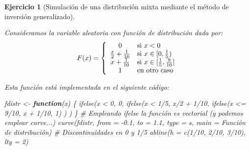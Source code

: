 \documentclass[
]{book}
\newenvironment{Shaded}{\begin{snugshade}}{\end{snugshade}}
\newcommand{\AttributeTok}[1]{\textcolor[rgb]{0.77,0.63,0.00}{#1}}
\newcommand{\CommentTok}[1]{\textcolor[rgb]{0.56,0.35,0.01}{\textit{#1}}}
\newcommand{\ControlFlowTok}[1]{\textcolor[rgb]{0.13,0.29,0.53}{\textbf{#1}}}
\newcommand{\DecValTok}[1]{\textcolor[rgb]{0.00,0.00,0.81}{#1}}
\newcommand{\FloatTok}[1]{\textcolor[rgb]{0.00,0.00,0.81}{#1}}
\newcommand{\FunctionTok}[1]{\textcolor[rgb]{0.00,0.00,0.00}{#1}}
\newcommand{\NormalTok}[1]{#1}
\newcommand{\OtherTok}[1]{\textcolor[rgb]{0.56,0.35,0.01}{#1}}
\newcommand{\SpecialCharTok}[1]{\textcolor[rgb]{0.00,0.00,0.00}{#1}}
\newcommand{\StringTok}[1]{\textcolor[rgb]{0.31,0.60,0.02}{#1}}
\theoremstyle{break}
\newtheorem{exercise}{Ejercicio}[chapter]
\theoremstyle{nonumberplain}
\begin{document}
\begin{exercise}[Simulación de una distribución mixta mediante el método de inversión generalizado]
\protect\hypertarget{exr:mixta-cuantil}{}\label{exr:mixta-cuantil}

Consideramos la variable aleatoria con función de distribución dada por:
\[F(x)=\left\{
\begin{array}
[c]{cl}0 & \mbox{si $x<0$}\\
\frac{x}{2}+\frac{1}{10} & \mbox{si $x\in[0,\frac{1}{5})$}\\
x+\frac{1}{10} & \mbox{si $x\in[\frac{1}{5},\frac{9}{10}]$}\\
1 & \mbox{en otro caso}
\end{array}
\right.\]

Esta función está implementada en el siguiente código:

\begin{Shaded}
\begin{Highlighting}[]
\NormalTok{fdistr }\OtherTok{\textless{}{-}} \ControlFlowTok{function}\NormalTok{(x) \{}
\FunctionTok{ifelse}\NormalTok{(x }\SpecialCharTok{\textless{}} \DecValTok{0}\NormalTok{, }\DecValTok{0}\NormalTok{,}
    \FunctionTok{ifelse}\NormalTok{(x }\SpecialCharTok{\textless{}} \DecValTok{1}\SpecialCharTok{/}\DecValTok{5}\NormalTok{, x}\SpecialCharTok{/}\DecValTok{2} \SpecialCharTok{+} \DecValTok{1}\SpecialCharTok{/}\DecValTok{10}\NormalTok{,}
        \FunctionTok{ifelse}\NormalTok{(x }\SpecialCharTok{\textless{}=} \DecValTok{9}\SpecialCharTok{/}\DecValTok{10}\NormalTok{, x }\SpecialCharTok{+} \DecValTok{1}\SpecialCharTok{/}\DecValTok{10}\NormalTok{, }\DecValTok{1}\NormalTok{) ) )}
\NormalTok{\}}
\CommentTok{\# Empleando ifelse la función es vectorial (y podemos emplear curve...)}
\FunctionTok{curve}\NormalTok{(fdistr, }\AttributeTok{from =} \SpecialCharTok{{-}}\FloatTok{0.1}\NormalTok{, }\AttributeTok{to =} \FloatTok{1.1}\NormalTok{, }\AttributeTok{type =} \StringTok{\textquotesingle{}s\textquotesingle{}}\NormalTok{, }
      \AttributeTok{main =} \StringTok{\textquotesingle{}Función de distribución\textquotesingle{}}\NormalTok{)}
\CommentTok{\# Discontinuidades en 0 y 1/5}
\FunctionTok{abline}\NormalTok{(}\AttributeTok{h =} \FunctionTok{c}\NormalTok{(}\DecValTok{1}\SpecialCharTok{/}\DecValTok{10}\NormalTok{, }\DecValTok{2}\SpecialCharTok{/}\DecValTok{10}\NormalTok{, }\DecValTok{3}\SpecialCharTok{/}\DecValTok{10}\NormalTok{), }\AttributeTok{lty =} \DecValTok{2}\NormalTok{) }
\end{Highlighting}
\end{Shaded}


\end{exercise}
\end{document}
